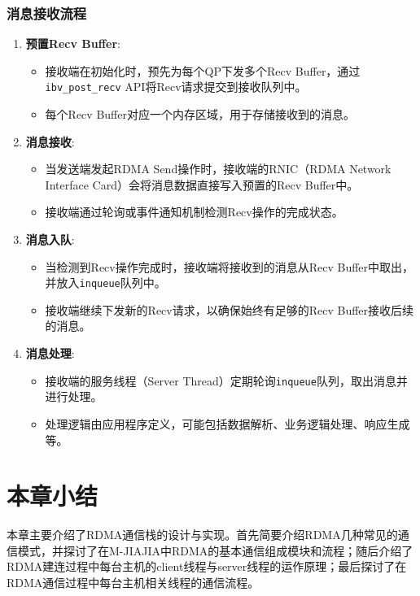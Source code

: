{\subsubsection{消息接收流程}
\begin{enumerate}[leftmargin=1em, align=left]
    \item \textbf{预置Recv Buffer}:
        \begin{itemize}[leftmargin=*, nosep]
            \item 接收端在初始化时，预先为每个QP下发多个Recv Buffer，通过\texttt{ibv\_post\_recv} API将Recv请求提交到接收队列中。
            \item 每个Recv Buffer对应一个内存区域，用于存储接收到的消息。
        \end{itemize}
    \item \textbf{消息接收}:
        \begin{itemize}[leftmargin=*, nosep]
            \item 当发送端发起RDMA Send操作时，接收端的RNIC（RDMA Network Interface Card）会将消息数据直接写入预置的Recv Buffer中。
            \item 接收端通过轮询或事件通知机制检测Recv操作的完成状态。
        \end{itemize}
    \item \textbf{消息入队}: 
        \begin{itemize}[leftmargin=*, nosep]
            \item 当检测到Recv操作完成时，接收端将接收到的消息从Recv Buffer中取出，并放入\texttt{inqueue}队列中。
            \item 接收端继续下发新的Recv请求，以确保始终有足够的Recv Buffer接收后续的消息。
        \end{itemize}
    \item \textbf{消息处理}: 
        \begin{itemize}[leftmargin=*, nosep]
            \item 接收端的服务线程（Server Thread）定期轮询\texttt{inqueue}队列，取出消息并进行处理。
            \item 处理逻辑由应用程序定义，可能包括数据解析、业务逻辑处理、响应生成等。
        \end{itemize}
\end{enumerate}


\section{本章小结}本章主要介绍了RDMA通信栈的设计与实现。首先简要介绍RDMA几种常见的通信模式，并探讨了在M-JIAJIA中RDMA的基本通信组成模块和流程；随后介绍了RDMA建连过程中每台主机的client线程与server线程的运作原理；最后探讨了在RDMA通信过程中每台主机相关线程的通信流程。

}

